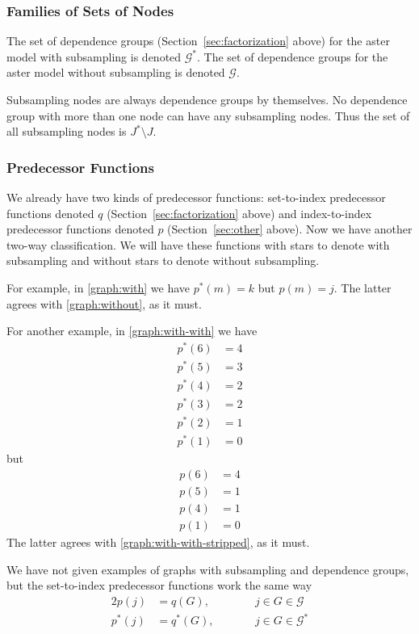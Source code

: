 \subsubsection{Families of Sets of Nodes}

The set of dependence groups
(Section~\ref{sec:factorization} above)
for the aster model with subsampling is denoted $\mathcal{G}^*$.
The set of dependence groups
for the aster model without subsampling is denoted $\mathcal{G}$.

Subsampling nodes are always dependence groups by themselves.
No dependence group with more than one node can have any subsampling nodes.
Thus the set of all subsampling nodes is $J^* \setminus J$.

\subsubsection{Predecessor Functions}

We already have two kinds of predecessor functions:
set-to-index predecessor functions denoted $q$
(Section~\ref{sec:factorization} above) and
index-to-index predecessor functions denoted $p$
(Section~\ref{sec:other} above).
Now we have another two-way classification.
We will have these functions with stars to denote with subsampling
and without stars to denote without subsampling.

For example, in \eqref{graph:with} we have $p^*(m) = k$ but $p(m) = j$.
The latter agrees with \eqref{graph:without}, as it must.

For another example, in \eqref{graph:with-with} we have
\begin{align*}
   p^*(6) & = 4
   \\
   p^*(5) & = 3
   \\
   p^*(4) & = 2
   \\
   p^*(3) & = 2
   \\
   p^*(2) & = 1
   \\
   p^*(1) & = 0
\end{align*}
but
\begin{align*}
   p(6) & = 4
   \\
   p(5) & = 1
   \\
   p(4) & = 1
   \\
   p(1) & = 0
\end{align*}
The latter agrees with \eqref{graph:with-with-stripped}, as it must.

We have not given examples of graphs with subsampling and dependence
groups, but the set-to-index predecessor functions work the same way
\begin{alignat*}{2}
   p(j) & = q(G), & \qquad & j \in G \in \mathcal{G}
   \\
   p^*(j) & = q^*(G), & & j \in G \in \mathcal{G}^*
\end{alignat*}

